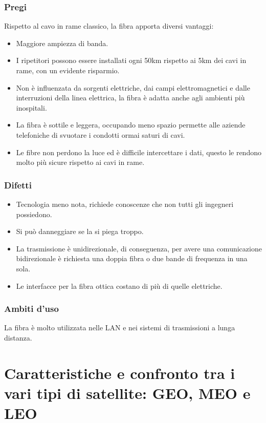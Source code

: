 \subsubsection{Pregi}
Rispetto al cavo in rame classico, la fibra apporta diversi vantaggi:
\begin{itemize}
	\item	Maggiore ampiezza di banda.
	\item	I ripetitori possono essere installati ogni 50km rispetto ai 5km dei cavi in rame, con un evidente risparmio.
	\item	Non è influenzata da sorgenti elettriche, dai campi elettromagnetici e dalle interruzioni della linea elettrica, la fibra è adatta anche agli ambienti più inospitali.
	\item	La fibra è sottile e leggera, occupando meno spazio permette alle aziende telefoniche di svuotare i condotti ormai saturi di cavi.
	\item	Le fibre non perdono la luce ed è difficile intercettare i dati, questo le rendono molto più sicure rispetto ai cavi in rame.
\end{itemize}

\subsubsection{Difetti}
\begin{itemize}
	\item	Tecnologia meno nota, richiede conoscenze che non tutti gli ingegneri possiedono.
	\item	Si può danneggiare se la si piega troppo.
	\item	La trasmissione è unidirezionale, di conseguenza, per avere una comunicazione bidirezionale è richiesta una doppia fibra o due bande di frequenza in una sola.
	\item	Le interfacce per la fibra ottica costano di più di quelle elettriche.
\end{itemize}

\subsubsection{Ambiti d'uso}
La fibra è molto utilizzata nelle LAN e nei sistemi di trasmissioni a lunga distanza.

\section{Caratteristiche e confronto tra i vari tipi di satellite: GEO, MEO e LEO}

